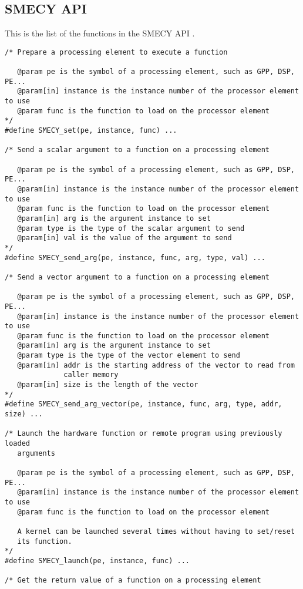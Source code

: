 \documentclass [A4]{article}
\begin{document}
	\subsection{SMECY API}
	This is the list of the functions in the SMECY API \cite{smec}.
	\begin{lstlisting}[frame=none,numbers=none]
/* Prepare a processing element to execute a function

   @param pe is the symbol of a processing element, such as GPP, DSP, PE...
   @param[in] instance is the instance number of the processor element to use
   @param func is the function to load on the processor element
*/
#define SMECY_set(pe, instance, func) ...

/* Send a scalar argument to a function on a processing element

   @param pe is the symbol of a processing element, such as GPP, DSP, PE...
   @param[in] instance is the instance number of the processor element to use
   @param func is the function to load on the processor element
   @param[in] arg is the argument instance to set
   @param type is the type of the scalar argument to send
   @param[in] val is the value of the argument to send
*/
#define SMECY_send_arg(pe, instance, func, arg, type, val) ...

/* Send a vector argument to a function on a processing element

   @param pe is the symbol of a processing element, such as GPP, DSP, PE...
   @param[in] instance is the instance number of the processor element to use
   @param func is the function to load on the processor element
   @param[in] arg is the argument instance to set
   @param type is the type of the vector element to send
   @param[in] addr is the starting address of the vector to read from
              caller memory
   @param[in] size is the length of the vector
*/
#define SMECY_send_arg_vector(pe, instance, func, arg, type, addr, size) ...

/* Launch the hardware function or remote program using previously loaded
   arguments

   @param pe is the symbol of a processing element, such as GPP, DSP, PE...
   @param[in] instance is the instance number of the processor element to use
   @param func is the function to load on the processor element

   A kernel can be launched several times without having to set/reset
   its function.
*/
#define SMECY_launch(pe, instance, func) ...

/* Get the return value of a function on a processing element


\end{lstlisting}
\end{document}
